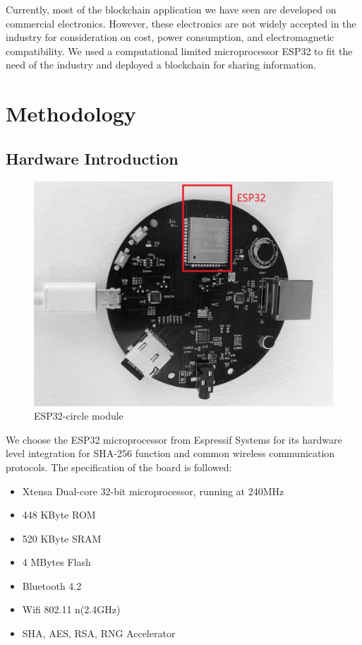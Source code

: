 \documentclass{article}
\begin{document}
    Currently, most of the blockchain application we have seen are developed on commercial electronics. However, these electronics are not widely accepted in the industry for consideration on cost, power consumption, and electromagnetic compatibility. We used a computational limited microprocessor ESP32 to fit the need of the industry and deployed a blockchain for sharing information.

\section{Methodology}

    \subsection{Hardware Introduction}\label{sec:hardware}

    \begin{figure}[h]
      \centering
      \includegraphics[scale=0.2]{esp32-circle.jpg}
      \caption{ESP32-circle module}
      \label{fig:espCircle}
    \end{figure}

    We choose the ESP32 microprocessor from Espressif Systems for its hardware level integration for SHA-256 function and common wireless communication protocols. The specification of the board is followed: \citep{espressifGithub}
    \begin{itemize}
      \item Xtensa Dual-core 32-bit microprocessor, running at 240MHz
      \item 448 KByte ROM
      \item 520 KByte SRAM
      \item 4 MBytes Flash
      \item Bluetooth 4.2
      \item Wifi 802.11 n(2.4GHz)
      \item SHA, AES, RSA, RNG Accelerator
    \end{itemize}
\end{document}

